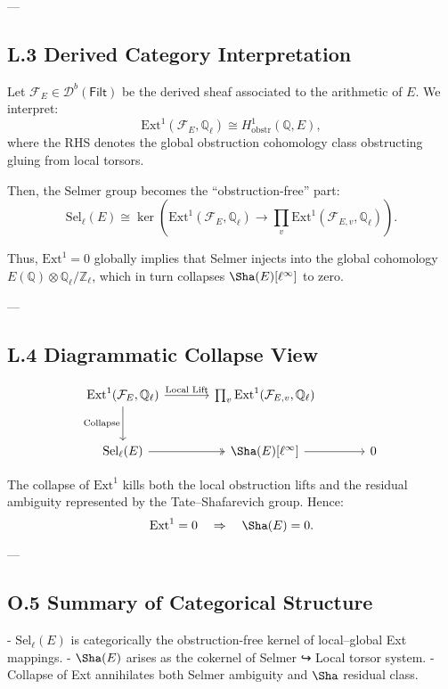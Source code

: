 ---

\subsection*{L.3 Derived Category Interpretation}

Let \( \mathcal{F}_E \in \mathcal{D}^b(\mathsf{Filt}) \) be the derived sheaf associated to the arithmetic of \( E \).  
We interpret:
\[
\mathrm{Ext}^1(\mathcal{F}_E, \mathbb{Q}_\ell) \cong H^1_{\mathrm{obstr}}(\mathbb{Q}, E),
\]
where the RHS denotes the global obstruction cohomology class obstructing gluing from local torsors.

Then, the Selmer group becomes the “obstruction-free” part:
\[
\mathrm{Sel}_\ell(E) \cong \ker\left(\mathrm{Ext}^1(\mathcal{F}_E, \mathbb{Q}_\ell) \to \prod_v \mathrm{Ext}^1(\mathcal{F}_{E,v}, \mathbb{Q}_\ell)\right).
\]

Thus, \( \mathrm{Ext}^1 = 0 \) globally implies that Selmer injects into the global cohomology \( E(\mathbb{Q}) \otimes \mathbb{Q}_\ell/\mathbb{Z}_\ell \),  
which in turn collapses \( \Sha(E)[\ell^\infty] \) to zero.

---

\subsection*{L.4 Diagrammatic Collapse View}

\[
\begin{tikzcd}[row sep=large, column sep=large]
\mathrm{Ext}^1(\mathcal{F}_E, \mathbb{Q}_\ell) \arrow[r, "\text{Local Lift}"] \arrow[d, swap, "\text{Collapse}"] &
\prod_v \mathrm{Ext}^1(\mathcal{F}_{E,v}, \mathbb{Q}_\ell) \\
\mathrm{Sel}_\ell(E) \arrow[r, two heads] & \Sha(E)[\ell^\infty] \arrow[r] & 0
\end{tikzcd}
\]

The collapse of \( \mathrm{Ext}^1 \) kills both the local obstruction lifts and the residual ambiguity  
represented by the Tate–Shafarevich group.  
Hence:
\[
\mathrm{Ext}^1 = 0 \quad \Rightarrow \quad \Sha(E) = 0.
\]

---

\subsection*{O.5 Summary of Categorical Structure}

- \( \mathrm{Sel}_\ell(E) \) is categorically the obstruction-free kernel of local–global Ext mappings.
- \( \Sha(E) \) arises as the cokernel of Selmer ↪ Local torsor system.
- Collapse of Ext annihilates both Selmer ambiguity and \( \Sha \) residual class.

